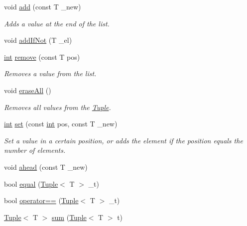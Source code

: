 \begin{DoxyCompactItemize}
\item 
void \mbox{\hyperlink{class_tuple_a5d3ee2809d790543195a6e2075aef7d0}{add}} (const T \+\_\+new)
\begin{DoxyCompactList}\small\item\em Adds a value at the end of the list. \end{DoxyCompactList}\item 
void \mbox{\hyperlink{class_tuple_a47e90df1240ffe62f6fd177ceea52a39}{add\+If\+Not}} (T \+\_\+el)
\item 
\mbox{\hyperlink{draw_8hh_aa620a13339ac3a1177c86edc549fda9b}{int}} \mbox{\hyperlink{class_tuple_a53a1abc3017d30cf1a6d6858caee8ce8}{remove}} (const T pos)
\begin{DoxyCompactList}\small\item\em Removes a value from the list. \end{DoxyCompactList}\item 
void \mbox{\hyperlink{class_tuple_ae36c533bd6e97ac45a2ed69a0c4760e4}{erase\+All}} ()
\begin{DoxyCompactList}\small\item\em Removes all values from the {\ttfamily \mbox{\hyperlink{class_tuple}{Tuple}}}. \end{DoxyCompactList}\item 
\mbox{\hyperlink{draw_8hh_aa620a13339ac3a1177c86edc549fda9b}{int}} \mbox{\hyperlink{class_tuple_a6ecd34c0308891b7bec87b4736a6eaa5}{set}} (const \mbox{\hyperlink{draw_8hh_aa620a13339ac3a1177c86edc549fda9b}{int}} pos, const T \+\_\+new)
\begin{DoxyCompactList}\small\item\em Set a value in a certain position, or adds the element if the position equals the number of elements. \end{DoxyCompactList}\item 
void \mbox{\hyperlink{class_tuple_a1173bba1687b01721f9e4e4c73de0d2a}{ahead}} (const T \+\_\+new)
\item 
bool \mbox{\hyperlink{class_tuple_a68d1d3aaecc187f8f78b46f4e1b48260}{equal}} (\mbox{\hyperlink{class_tuple}{Tuple}}$<$ T $>$ \+\_\+t)
\item 
bool \mbox{\hyperlink{class_tuple_ad8f90a7c0726fae5ac5651c4e16222cd}{operator==}} (\mbox{\hyperlink{class_tuple}{Tuple}}$<$ T $>$ \+\_\+t)
\item 
\mbox{\hyperlink{class_tuple}{Tuple}}$<$ T $>$ \mbox{\hyperlink{class_tuple_a2b595ce33576c6fcb36d74b46f0a7c55}{sum}} (\mbox{\hyperlink{class_tuple}{Tuple}}$<$ T $>$ t)
\item 

\end{DoxyCompactItemize}
